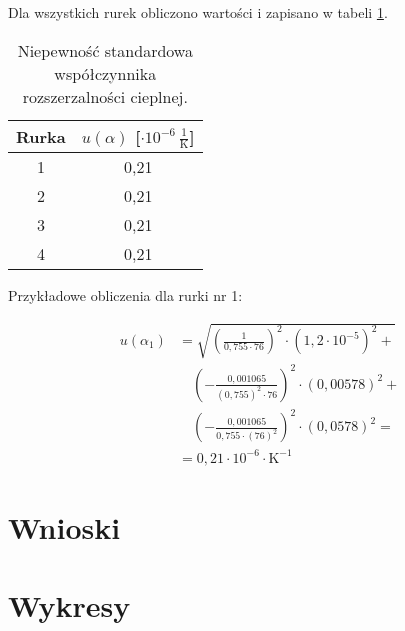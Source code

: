 \documentclass[a4paper,12pt]{article}
\begin{document}
Dla wszystkich rurek obliczono wartości i zapisano w tabeli \ref{tab:niepewnosci_wspolczynnik_rozszerzalnosci}.

\begin{table}[H]
    \centering
    \begin{tabular}{|c|c|}
        \hline
        Rurka & $u(\alpha)$ [$\cdot 10^{-6}\,\frac{1}{\text{K}}$] \\
        \hline
        1 & 0,21 \\
        2 & 0,21 \\
        3 & 0,21 \\
        4 & 0,21 \\
        \hline
    \end{tabular}
    \caption{Niepewność standardowa współczynnika rozszerzalności cieplnej.}
    \label{tab:niepewnosci_wspolczynnik_rozszerzalnosci}
\end{table}

Przykładowe obliczenia dla rurki nr 1:

\begin{align*}
    u(\alpha_1) & = \sqrt{\left(\frac{1}{0{,}755 \cdot 76}\right)^2 \cdot (1{,}2 \cdot 10^{-5})^2 +}  \\
                & \quad \left(-\frac{0{,}001065}{(0{,}755)^2 \cdot 76}\right)^2 \cdot (0{,}00578)^2 + \\
                & \quad \left(-\frac{0{,}001065}{0{,}755 \cdot (76)^2}\right)^2 \cdot (0{,}0578)^2 =  \\
                & = 0{,}21 \cdot 10^{-6} \cdot \text{K}^{-1}
\end{align*}

\section{Wnioski}



\section{Wykresy}



\end{document}
